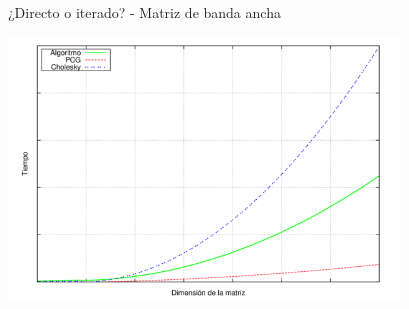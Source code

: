 \documentclass [8pt] {beamer}
\begin{document}
        \begin{frame}{¿Directo o iterado? - Matriz de banda ancha}
            \begin{center}
                \includegraphics[height=7cm]{m-simetricaancha.png}
            \end{center}
        \end{frame}
\end{document}
